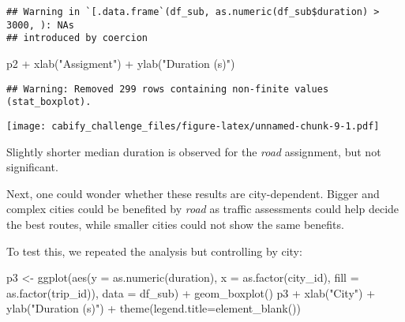 \documentclass[
]{article}
\newenvironment{Shaded}{\begin{snugshade}}{\end{snugshade}}
\newcommand{\AttributeTok}[1]{\textcolor[rgb]{0.77,0.63,0.00}{#1}}
\newcommand{\DecValTok}[1]{\textcolor[rgb]{0.00,0.00,0.81}{#1}}
\newcommand{\FunctionTok}[1]{\textcolor[rgb]{0.00,0.00,0.00}{#1}}
\newcommand{\NormalTok}[1]{#1}
\newcommand{\OtherTok}[1]{\textcolor[rgb]{0.56,0.35,0.01}{#1}}
\newcommand{\SpecialCharTok}[1]{\textcolor[rgb]{0.00,0.00,0.00}{#1}}
\newcommand{\StringTok}[1]{\textcolor[rgb]{0.31,0.60,0.02}{#1}}
\begin{document}
\begin{Shaded}
\end{Shaded}

\begin{verbatim}
## Warning in `[.data.frame`(df_sub, as.numeric(df_sub$duration) > 3000, ): NAs
## introduced by coercion
\end{verbatim}

\begin{Shaded}
\begin{Highlighting}[]
\NormalTok{p2 }\SpecialCharTok{+} \FunctionTok{xlab}\NormalTok{(}\StringTok{"Assigment"}\NormalTok{) }\SpecialCharTok{+} \FunctionTok{ylab}\NormalTok{(}\StringTok{"Duration (s)"}\NormalTok{) }
\end{Highlighting}
\end{Shaded}

\begin{verbatim}
## Warning: Removed 299 rows containing non-finite values (stat_boxplot).
\end{verbatim}

\texttt{[image: cabify\_challenge\_files/figure-latex/unnamed-chunk-9-1.pdf]}

Slightly shorter median duration is observed for the \emph{road}
assignment, but not significant.

Next, one could wonder whether these results are city-dependent. Bigger
and complex cities could be benefited by \emph{road} as traffic
assessments could help decide the best routes, while smaller cities
could not show the same benefits.

To test this, we repeated the analysis but controlling by city:

\begin{Shaded}
\begin{Highlighting}[]
\NormalTok{p3 }\OtherTok{\textless{}{-}} \FunctionTok{ggplot}\NormalTok{(}\FunctionTok{aes}\NormalTok{(}\AttributeTok{y =} \FunctionTok{as.numeric}\NormalTok{(duration), }\AttributeTok{x =} \FunctionTok{as.factor}\NormalTok{(city\_id), }
                 \AttributeTok{fill =} \FunctionTok{as.factor}\NormalTok{(trip\_id)), }\AttributeTok{data =}\NormalTok{ df\_sub) }\SpecialCharTok{+} \FunctionTok{geom\_boxplot}\NormalTok{() }
\NormalTok{p3 }\SpecialCharTok{+} \FunctionTok{xlab}\NormalTok{(}\StringTok{"City"}\NormalTok{) }\SpecialCharTok{+} \FunctionTok{ylab}\NormalTok{(}\StringTok{"Duration (s)"}\NormalTok{) }\SpecialCharTok{+} \FunctionTok{theme}\NormalTok{(}\AttributeTok{legend.title=}\FunctionTok{element\_blank}\NormalTok{()) }
\end{Highlighting}
\end{Shaded}
\end{document}
